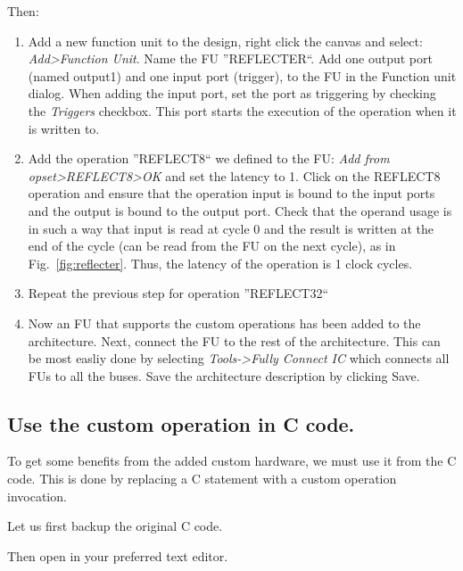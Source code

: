 \documentclass[twoside]{tceusermanual}
\begin{document}
Then:
\begin{enumerate}
\item%
  Add a new function unit to the design, right click the canvas and
  select: \textit{Add>Function Unit}. Name the FU ''REFLECTER``. Add
  one output port (named output1) and one input port (trigger), to
  the FU in the Function unit dialog. When adding the input port, set
  the port as triggering by checking the \textit{Triggers} checkbox. This port
  starts the execution of the operation when it is written to.
\item%
  Add the operation ''REFLECT8`` we defined to the FU: \textit{Add
  from opset>REFLECT8>OK} and set the latency to 1. Click on the
  REFLECT8 operation and ensure that the operation input is bound to
  the input ports and the output is bound to the output port. Check
  that the operand usage is in such a way that input is read at cycle
  0 and the result is written at the end of the cycle (can be read
  from the FU on the next cycle), as in
  Fig.~\ref{fig:reflecter}. Thus, the latency of the operation is 1
  clock cycles.
\item%
  Repeat the previous step for operation ''REFLECT32``
\item%
  Now an FU that supports the custom operations has been added to the
  architecture. Next, connect the FU to the rest of the
  architecture. This can be most easliy done by selecting
  \textit{Tools->Fully Connect IC} which connects all FUs to all the
  buses. Save the architecture description by clicking Save.
\end{enumerate}


\subsection{Use the custom operation in C code.}

To get some benefits from the added custom hardware, we must use it
from the C code. This is done by replacing a C statement with a custom
operation invocation.

Let us first backup the original C code.


Then open  in your preferred text editor.
\end{document}
